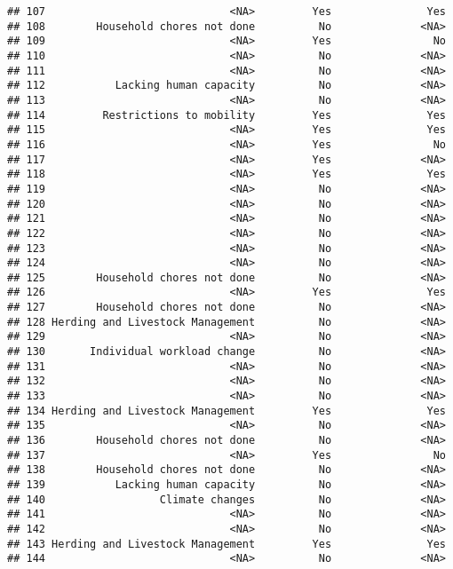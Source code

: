 \documentclass[
]{article}
\begin{document}
\begin{verbatim}
## 107                             <NA>         Yes               Yes
## 108        Household chores not done          No              <NA>
## 109                             <NA>         Yes                No
## 110                             <NA>          No              <NA>
## 111                             <NA>          No              <NA>
## 112           Lacking human capacity          No              <NA>
## 113                             <NA>          No              <NA>
## 114         Restrictions to mobility         Yes               Yes
## 115                             <NA>         Yes               Yes
## 116                             <NA>         Yes                No
## 117                             <NA>         Yes              <NA>
## 118                             <NA>         Yes               Yes
## 119                             <NA>          No              <NA>
## 120                             <NA>          No              <NA>
## 121                             <NA>          No              <NA>
## 122                             <NA>          No              <NA>
## 123                             <NA>          No              <NA>
## 124                             <NA>          No              <NA>
## 125        Household chores not done          No              <NA>
## 126                             <NA>         Yes               Yes
## 127        Household chores not done          No              <NA>
## 128 Herding and Livestock Management          No              <NA>
## 129                             <NA>          No              <NA>
## 130       Individual workload change          No              <NA>
## 131                             <NA>          No              <NA>
## 132                             <NA>          No              <NA>
## 133                             <NA>          No              <NA>
## 134 Herding and Livestock Management         Yes               Yes
## 135                             <NA>          No              <NA>
## 136        Household chores not done          No              <NA>
## 137                             <NA>         Yes                No
## 138        Household chores not done          No              <NA>
## 139           Lacking human capacity          No              <NA>
## 140                  Climate changes          No              <NA>
## 141                             <NA>          No              <NA>
## 142                             <NA>          No              <NA>
## 143 Herding and Livestock Management         Yes               Yes
## 144                             <NA>          No              <NA>

\end{verbatim}
\end{document}
